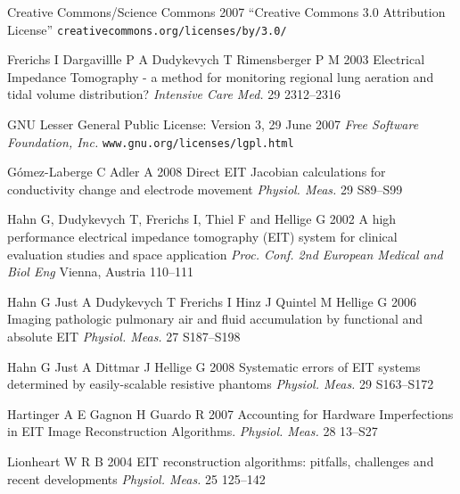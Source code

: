 \documentclass[12pt]{iopart}
\begin{document}
\item[]
Creative Commons/Science Commons 2007
``Creative Commons 3.0 Attribution License''
\verb+creativecommons.org/licenses/by/3.0/+

%
\item[]
Frerichs I Dargavillle P A Dudykevych T Rimensberger P M 2003
Electrical Impedance Tomography - a method for monitoring
regional lung aeration and tidal volume distribution?
{\em  Intensive Care Med.}
29 2312--2316

\item[]
GNU Lesser General Public License: Version 3, 29 June 2007
{\em Free Software Foundation, Inc.}
\verb+www.gnu.org/licenses/lgpl.html+

G\'omez-Laberge C Adler A 2008
Direct EIT Jacobian calculations for conductivity change and electrode movement
{\em Physiol. Meas.}
29 S89--S99



\item[]
Hahn G, Dudykevych T, Frerichs I, Thiel F and Hellige G 2002
A high performance electrical impedance tomography
(EIT) system for clinical evaluation studies and space application
{\em Proc. Conf. 2nd European Medical and
Biol Eng} Vienna, Austria 110--111

\item[]
Hahn G Just A Dudykevych T Frerichs I Hinz J  Quintel M Hellige G
2006
Imaging pathologic pulmonary air and fluid accumulation by
 functional and absolute EIT
{\em Physiol. Meas.}
27 S187--S198

\item[]
Hahn G Just A Dittmar J  Hellige G 2008
Systematic errors of EIT systems determined by easily-scalable
 resistive phantoms
{\em Physiol. Meas.}
 29 S163--S172



\item[]
Hartinger A E Gagnon H Guardo R 2007
Accounting for Hardware Imperfections in EIT Image
Reconstruction Algorithms.
{\em Physiol. Meas.}
28 13--S27
 
\item[]
Lionheart W R B 2004
EIT reconstruction algorithms: pitfalls, challenges
and recent developments
{\em Physiol. Meas.}
25 125--142
\end{document}

